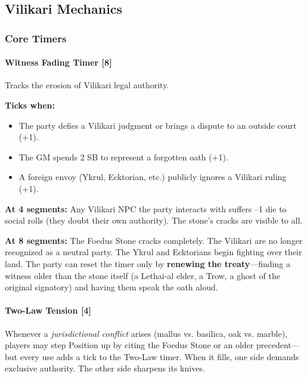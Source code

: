 \subsection{Vilikari Mechanics}
\label{sec:vilikari-mechanics}

\subsubsection{Core Timers}

\paragraph{Witness Fading Timer [8]}
Tracks the erosion of Vilikari legal authority.

\textbf{Ticks when:}
\begin{itemize}[nosep]
  \item The party defies a Vilikari judgment or brings a dispute to an outside court (+1).
  \item The GM spends 2 SB to represent a forgotten oath (+1).
  \item A foreign envoy (Ykrul, Ecktorian, etc.) publicly ignores a Vilikari ruling (+1).
\end{itemize}

\textbf{At 4 segments:} Any Vilikari NPC the party interacts with suffers --1 die to social rolls (they doubt their own authority). The stone's cracks are visible to all.

\textbf{At 8 segments:} The Foedus Stone cracks completely. The Vilikari are no longer recognized as a neutral party. The Ykrul and Ecktorians begin fighting over their land. The party can reset the timer only by \textbf{renewing the treaty}---finding a witness older than the stone itself (a Lethai-al elder, a Trow, a ghost of the original signatory) and having them speak the oath aloud.

\paragraph{Two-Law Tension [4]}
Whenever a \emph{jurisdictional conflict} arises (mallus vs. basilica, oak vs. marble), players may step Position up by citing the Foedus Stone or an older precedent---but every use adds a tick to the Two-Law timer. When it fills, one side demands exclusive authority. The other side sharpens its knives.

